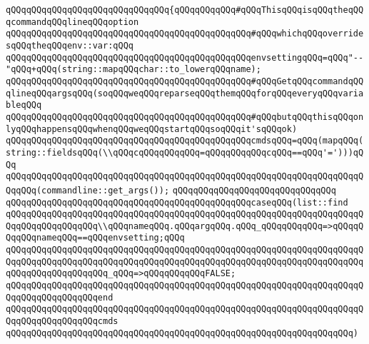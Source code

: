 \verb|qQQqqQQqqQQqqQQqqQQqqQQqqQQqqQQq{qQQqqQQqqQQq#qQQqThisqQQqisqQQqtheqQQqcommandqQQqlineqQQqoption|\newline
\verb|qQQqqQQqqQQqqQQqqQQqqQQqqQQqqQQqqQQqqQQqqQQqqQQq#qQQqwhichqQQqoverridesqQQqtheqQQqenv::var:qQQq|\newline
\newline
\verb|qQQqqQQqqQQqqQQqqQQqqQQqqQQqqQQqqQQqqQQqqQQqqQQqenvsettingqQQq=qQQq"--"qQQq+qQQq(string::mapqQQqchar::to_lowerqQQqname);|\newline
\newline
\verb|qQQqqQQqqQQqqQQqqQQqqQQqqQQqqQQqqQQqqQQqqQQqqQQq#qQQqGetqQQqcommandqQQqlineqQQqargsqQQq(soqQQqweqQQqreparseqQQqthemqQQqforqQQqeveryqQQqvariableqQQq|\newline
\verb|qQQqqQQqqQQqqQQqqQQqqQQqqQQqqQQqqQQqqQQqqQQqqQQq#qQQqbutqQQqthisqQQqonlyqQQqhappensqQQqwhenqQQqweqQQqstartqQQqsoqQQqit'sqQQqok)|\newline
\newline
\verb|qQQqqQQqqQQqqQQqqQQqqQQqqQQqqQQqqQQqqQQqqQQqqQQqcmdsqQQq=qQQq(mapqQQq(string::fieldsqQQq(\\qQQqcqQQqqQQqqQQq=qQQqqQQqqQQqcqQQq==qQQq'=')))qQQq|\newline
\verb|qQQqqQQqqQQqqQQqqQQqqQQqqQQqqQQqqQQqqQQqqQQqqQQqqQQqqQQqqQQqqQQqqQQqqQQqqQQq(commandline::get_args());|\newline
\verb|qQQqqQQqqQQqqQQqqQQqqQQqqQQqqQQq|\newline
\verb|qQQqqQQqqQQqqQQqqQQqqQQqqQQqqQQqqQQqqQQqqQQqqQQqcaseqQQq(list::find|\newline
\verb|qQQqqQQqqQQqqQQqqQQqqQQqqQQqqQQqqQQqqQQqqQQqqQQqqQQqqQQqqQQqqQQqqQQqqQQqqQQqqQQqqQQqqQQq\\qQQqnameqQQq.qQQqargqQQq.qQQq_qQQqqQQqqQQq=>qQQqqQQqqQQqnameqQQq==qQQqenvsetting;qQQq|\newline
\verb|qQQqqQQqqQQqqQQqqQQqqQQqqQQqqQQqqQQqqQQqqQQqqQQqqQQqqQQqqQQqqQQqqQQqqQQqqQQqqQQqqQQqqQQqqQQqqQQqqQQqqQQqqQQqqQQqqQQqqQQqqQQqqQQqqQQqqQQqqQQqqQQqqQQqqQQqqQQqqQQq_qQQq=>qQQqqQQqqQQqFALSE;|\newline
\verb|qQQqqQQqqQQqqQQqqQQqqQQqqQQqqQQqqQQqqQQqqQQqqQQqqQQqqQQqqQQqqQQqqQQqqQQqqQQqqQQqqQQqqQQqend|\newline
\verb|qQQqqQQqqQQqqQQqqQQqqQQqqQQqqQQqqQQqqQQqqQQqqQQqqQQqqQQqqQQqqQQqqQQqqQQqqQQqqQQqqQQqqQQqcmds|\newline
\verb|qQQqqQQqqQQqqQQqqQQqqQQqqQQqqQQqqQQqqQQqqQQqqQQqqQQqqQQqqQQqqQQqqQQq)|\newline
\newline
